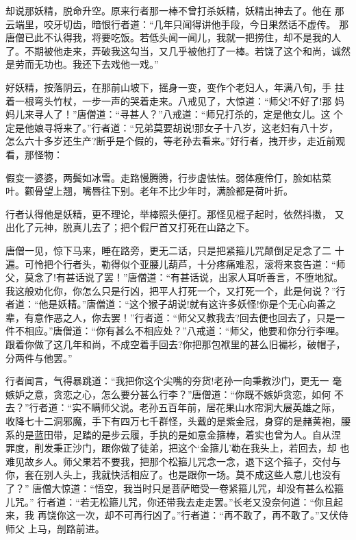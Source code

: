 却说那妖精，脱命升空。原来行者那一棒不曾打杀妖精，妖精出神去了。他在
那云端里，咬牙切齿，暗恨行者道：“几年只闻得讲他手段，今日果然话不虚传。
那唐僧已此不认得我，将要吃饭。若低头闻一闻儿，我就一把捞住，却不是我的人
了。不期被他走来，弄破我这勾当，又几乎被他打了一棒。若饶了这个和尚，诚然
是劳而无功也。我还下去戏他一戏。”

好妖精，按落阴云，在那前山坡下，摇身一变，变作个老妇人，年满八旬，手
拄着一根弯头竹杖，一步一声的哭着走来。八戒见了，大惊道：“师父!不好了!那
妈妈儿来寻人了！”唐僧道：“寻甚人？”八戒道：“师兄打杀的，定是他女儿。这
个定是他娘寻将来了。”行者道：“兄弟莫要胡说!那女子十八岁，这老妇有八十岁，
怎么六十多岁还生产?断乎是个假的，等老孙去看来。”好行者，拽开步，走近前观
看，那怪物：

假变一婆婆，两鬓如冰雪。走路慢腾腾，行步虚怯怯。弱体瘦伶仃，脸如枯菜
叶。颧骨望上翘，嘴唇往下别。老年不比少年时，满脸都是荷叶折。

行者认得他是妖精，更不理论，举棒照头便打。那怪见棍子起时，依然抖擞，
又出化了元神，脱真儿去了；把个假尸首又打死在山路之下。

唐僧一见，惊下马来，睡在路旁，更无二话，只是把紧箍儿咒颠倒足足念了二
十遍。可怜把个行者头，勒得似个亚腰儿葫芦，十分疼痛难忍，滚将来哀告道：“师
父，莫念了!有甚话说了罢！”唐僧道：“有甚话说，出家人耳听善言，不堕地狱。
我这般劝化你，你怎么只是行凶，把平人打死一个，又打死一个，此是何说？”行
者道：“他是妖精。”唐僧道：“这个猴子胡说!就有这许多妖怪!你是个无心向善之
辈，有意作恶之人，你去罢！”行者道：“师父又教我去?回去便也回去了，只是一
件不相应。”唐僧道：“你有甚么不相应处？”八戒道：“师父，他要和你分行李哩。
跟着你做了这几年和尚，不成空着手回去?你把那包袱里的甚么旧褊衫，破帽子，
分两件与他罢。”

行者闻言，气得暴跳道：“我把你这个尖嘴的夯货!老孙一向秉教沙门，更无一
毫嫉妒之意，贪恋之心，怎么要分甚么行李？”唐僧道：“你既不嫉妒贪恋，如何
不去？”行者道：“实不瞒师父说。老孙五百年前，居花果山水帘洞大展英雄之际，
收降七十二洞邪魔，手下有四万七千群怪，头戴的是紫金冠，身穿的是赭黄袍，腰
系的是蓝田带，足踏的是步云履，手执的是如意金箍棒，着实也曾为人。自从涅
罪度，削发秉正沙门，跟你做了徒弟，把这个‘金箍儿’勒在我头上，若回去，却
也难见故乡人。师父果若不要我，把那个松箍儿咒念一念，退下这个箍子，交付与
你，套在别人头上，我就快活相应了。也是跟你一场。莫不成这些人意儿也没有了？”
唐僧大惊道：“悟空，我当时只是菩萨暗受一卷紧箍儿咒，却没有甚么松箍儿咒。”
行者道：“若无松箍儿咒，你还带我去走走罢。”长老又没奈何道：“你且起来，我
再饶你这一次，却不可再行凶了。”行者道：“再不敢了，再不敢了。”又伏侍师父
上马，剖路前进。

